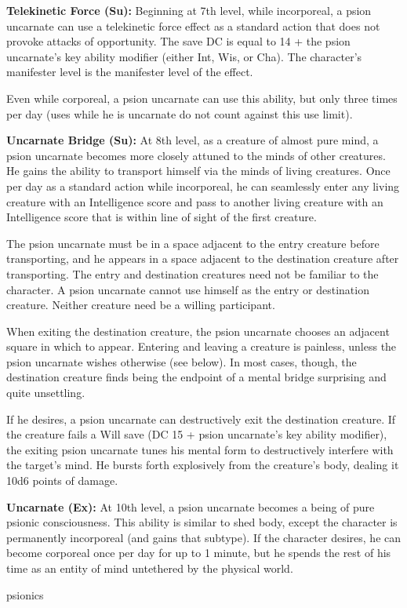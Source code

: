 {\textbf{Telekinetic Force (Su):} Beginning at 7th level, while incorporeal, a psion uncarnate can use a telekinetic force effect as a standard action that does not provoke attacks of opportunity. The save DC is equal to 14 + the psion uncarnate's key ability modifier (either Int, Wis, or Cha). The character's manifester level is the manifester level of the effect.

Even while corporeal, a psion uncarnate can use this ability, but only three times per day (uses while he is uncarnate do not count against this use limit).

\textbf{Uncarnate Bridge (Su):} At 8th level, as a creature of almost pure mind, a psion uncarnate becomes more closely attuned to the minds of other creatures. He gains the ability to transport himself via the minds of living creatures. Once per day as a standard action while incorporeal, he can seamlessly enter any living creature with an Intelligence score and pass to another living creature with an Intelligence score that is within line of sight of the first creature.

The psion uncarnate must be in a space adjacent to the entry creature before transporting, and he appears in a space adjacent to the destination creature after transporting. The entry and destination creatures need not be familiar to the character. A psion uncarnate cannot use himself as the entry or destination creature. Neither creature need be a willing participant.

When exiting the destination creature, the psion uncarnate chooses an adjacent square in which to appear. Entering and leaving a creature is painless, unless the psion uncarnate wishes otherwise (see below). In most cases, though, the destination creature finds being the endpoint of a mental bridge surprising and quite unsettling.

If he desires, a psion uncarnate can destructively exit the destination creature. If the creature fails a Will save (DC 15 + psion uncarnate's key ability modifier), the exiting psion uncarnate tunes his mental form to destructively interfere with the target's mind. He bursts forth explosively from the creature's body, dealing it 10d6 points of damage.

\textbf{Uncarnate (Ex):} At 10th level, a psion uncarnate becomes a being of pure psionic consciousness. This ability is similar to shed body, except the character is permanently incorporeal (and gains that subtype). If the character desires, he can become corporeal once per day for up to 1 minute, but he spends the rest of his time as an entity of mind untethered by the physical world.
}
{}
{psionics}
{}
{}
{}